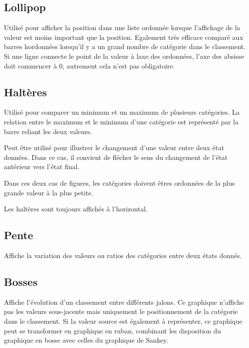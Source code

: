 \documentclass[a4paper,12pt]{article}
\begin{document}
\begin{multicols}{2}
\subsection*{Lollipop}
\label{sec:org4d74e68}
Utilisé pour afficher la position dans une liste ordonnée lorsque l'affichage de la valeur est moins important que la position. \autocite{alansmithLexiqueVisuel} Egalement très efficace comparé aux barres hordonnées lorsqu'il y a un grand nombre de catégorie dans le classement. \autocite{mikeyiHowChooseRight2020}  Si une ligne connecte le point de la valeur à laxe des ordonnées, l'axe des absisse doit commencer à 0, autrement cela n'est pas obligatoire.
\subsection*{Haltères}
\label{sec:org3681691}
Utilisé pour comparer un minimum et un maximum de plusieurs catégories. \autocite{alansmithLexiqueVisuel} La relation entre le maximum et le minimum d'une catégorie est représenté par la barre reliant les deux valeurs. \autocite{mikeyiHowChooseRight2020}

Peut être utilisé pour illustrer le changement d'une valeur entre deux état données. Dans ce cas, il convient de flécher le sens du changement de l'état antérieur vers l'état final.

Dans ces deux cas de figures, les catégories doivent êtres ordonnées de la plus grande valeur à la plus petite.

Les haltères sont toujours affichés à l'horizontal.
\subsection*{Pente}
\label{sec:org48d8d0b}
Affiche la variation des valeurs ou ratios des catégories entre deux états donnés. \autocite{alansmithLexiqueVisuel}
\subsection*{Bosses}
\label{sec:orgbee0515}
Affiche l'évolution d'un classement entre différents jalons. \autocite{mikeyiHowChooseRight2020,alansmithLexiqueVisuel}  Ce graphique n'affiche pas les valeurs sous-jacente mais uniquement le positionnement de la catégorie dans le classement. \autocite{jonathanschwabishTime2021} Si la valeur source est également à représenter, ce graphique peut se transformer en graphique en ruban, combinant les disposition du graphique en bosse avec celles du graphique de Sankey. \autocite{jonathanschwabishTime2021}

\end{multicols}
\end{document}
